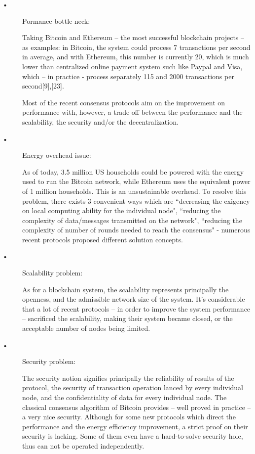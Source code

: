 \documentclass[doublespacing]{bmcart}
\begin{document}
\begin{CJK*}{UTF8}{gbsn}
\begin{description}
\item[•] Pormance bottle neck:

Taking Bitcoin and Ethereum – the most successful blockchain projects – as examples: in Bitcoin, the system could process 7 transactions per second in average, and with Ethereum, this number is currently 20, which is much lower than centralized online payment system such like Paypal and Visa, which – in practice -  process separately 115 and 2000 transactions per second[9],[23].

	Most of the recent consensus protocols aim on the improvement on performance with, however, a trade off between the performance and the scalability, the security and/or the decentralization. 

\item[•] Energy overhead issue:

As of today, 3.5 million US households could be powered with the energy used to run the Bitcoin network, while Ethereum uses the equivalent power of 1 million households. This is an unsustainable overhead. To resolve this problem, there exists 3 convenient ways which are ``decreasing the exigency on local computing ability for the individual node", ``reducing the complexity of data/messages transmitted on the network", ``reducing the complexity of number of rounds needed to reach the consensus" - numerous recent protocols proposed different solution concepts.

\item[•] Scalability problem:

As for a blockchain system, the scalability represents principally the openness, and the admissible network size of the system. It’s considerable that a lot of recent protocols – in order to improve the system performance – sacrificed the scalability, making their system became closed, or the acceptable number of nodes being limited. 

\item[•] Security problem:

The security notion signifies principally the reliability of results of the protocol, the security of transaction operation lanced by every individual node, and the confidentiality of data for every individual node. The classical consensus algorithm of Bitcoin provides – well proved in practice – a very nice security. Although for some new protocols which direct the performance and the energy efficiency improvement, a strict proof on their security is lacking. Some of them even have a hard-to-solve security hole, thus can not be operated independently.


\end{description}
\end{CJK*}
\end{document}
